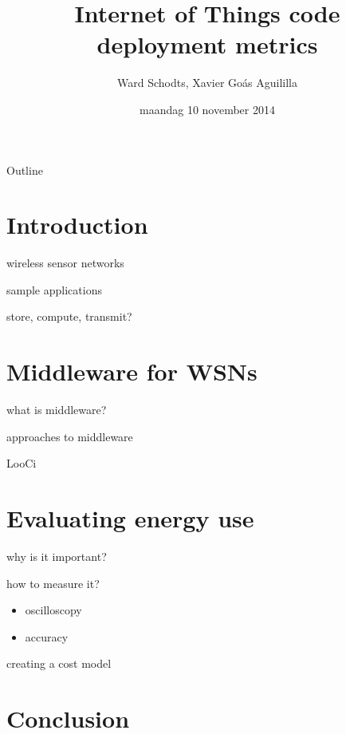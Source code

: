 \documentclass[presentation]{beamer}
\author{Ward Schodts, Xavier Goás Aguililla}
\date{maandag 10 november 2014}
\title{Internet of Things code deployment metrics}
\begin{document}
\maketitle
\begin{frame}{Outline}
\tableofcontents
\end{frame}


\section{Introduction}
\label{sec-1}
\begin{frame}[label=sec-1-1]{wireless sensor networks}
\end{frame}
\begin{frame}[label=sec-1-2]{sample applications}
\end{frame}
\begin{frame}[label=sec-1-3]{store, compute, transmit?}
\end{frame}
\section{Middleware for WSNs}
\label{sec-2}
\begin{frame}[label=sec-2-1]{what is middleware?}
\end{frame}
\begin{frame}[label=sec-2-2]{approaches to middleware}
\end{frame}
\begin{frame}[label=sec-2-3]{LooCi}
\end{frame}
\section{Evaluating energy use}
\label{sec-3}

\begin{frame}[label=sec-3-1]{why is it important?}
\end{frame}
\begin{frame}[label=sec-3-2]{how to measure it?}
\begin{itemize}
\item oscilloscopy
\item accuracy
\end{itemize}
\end{frame}

\begin{frame}[label=sec-3-3]{creating a cost model}
\end{frame}
\section{Conclusion}
\label{sec-4}
\end{document}
